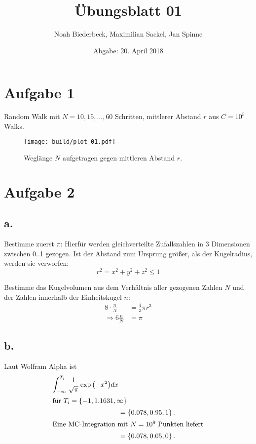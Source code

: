 \documentclass{scrartcl}
\title{Übungsblatt 01}
\author{%
  Noah Biederbeck, Maximilian Sackel, Jan Spinne
}
\date{Abgabe: 20. April 2018}
\begin{document}
\maketitle

\section*{Aufgabe 1}
Random Walk mit $N = 10, 15, \ldots, 60$ Schritten,
mittlerer Abstand $r$ aus $C = 10^5$ Walks.
\begin{figure}[h]
  \centering
  \texttt{[image: build/plot\_01.pdf]}
  \caption{Weglänge $N$ aufgetragen gegen mittleren Abstand $r$.}%
  \label{fig:build/plot_01}
\end{figure}

\section*{Aufgabe 2}
\subsection*{a.}
Bestimme zuerst $\pi$:
Hierfür werden gleichverteilte Zufallszahlen in 3 Dimensionen
zwischen 0..1 gezogen.
Ist der Abstand zum Ursprung größer, als der Kugelradius,
werden sie verworfen:
\begin{equation}
  r^2 = x^2 + y^2 + z^2 \le 1
\end{equation}

Bestimme das Kugelvolumen aus dem Verhältnis aller gezogenen Zahlen $N$
und der Zahlen innerhalb der Einheitskugel $n$:
\begin{align}
  8 \cdot \frac{n}{N} &= \frac{4}{3} \pi r^3 \\
  \Rightarrow 6 \frac{n}{N} &= \pi
\end{align}

\subsection*{b.}
Laut Wolfram Alpha ist
\begin{align}
  \int_{-\infty}^{T_i} \frac{1}{\sqrt{\pi}} \exp{\left(-x^2\right)} dx&\\
  \intertext{für $T_i = \left\{-1, 1.1631, \infty\right\}$}
  &= \left\{0.078, 0.95, 1\right\}.\\
  \intertext{Eine MC-Integration mit $N = 10^9$ Punkten liefert}
  &= \left\{0.078, 0.05, 0\right\}.
\end{align}
\end{document}
